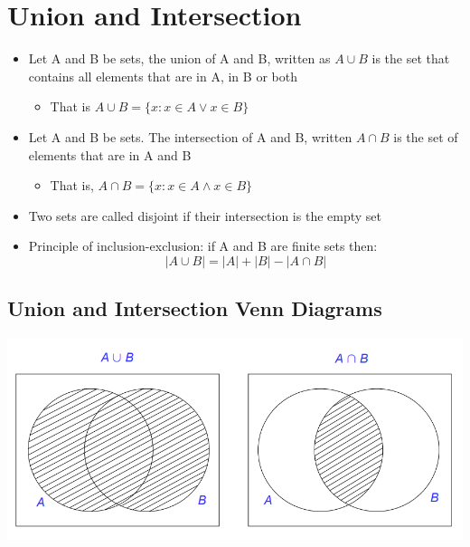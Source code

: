 \documentclass{article}[18pt]
\begin{document}
\section{Union and Intersection}
\begin{itemize}
	\item Let A and B be sets, the union of A and B, written as $A\cup B$ is the set that contains all elements that are in A, in B or both
	\begin{itemize}
		\item That is $A \cup B = \{ x : x \in A \vee x \in B \}$
	\end{itemize}
	\item Let A and B be sets. The intersection of A and B, written $A \cap B$ is the set of elements that are in A and B
	\begin{itemize}
		\item That is, $A \cap B = \{ x : x \in A \wedge x \in B \}$
	\end{itemize}
	\item Two sets are called disjoint if their intersection is the empty set
		\item Principle of inclusion-exclusion: if A and B are finite sets then:
		$$| A \cup B | = | A | + | B | - | A \cap B |$$
\end{itemize}
\subsection{Union and Intersection Venn Diagrams}
\begin{center}
	\includegraphics[scale=0.7]{venn2}
\end{center}
\end{document}
